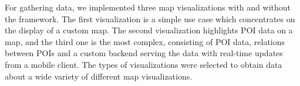 For gathering data, we implemented three  map visualizations with and without the framework. The first visualization is a simple use case which concentrates on the display of a custom map. The second visualization highlights POI data on a map, and the third one is the most complex, consisting of POI data, relations between POIs and a custom backend serving the data with real-time updates from a mobile client. The types of visualizations were selected to obtain data about a wide variety of different map visualizations. 


